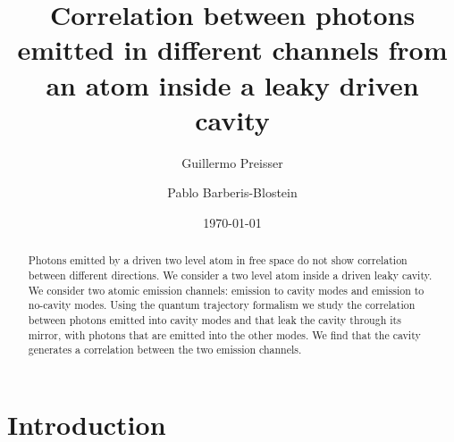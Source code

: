 \documentclass[%
 reprint,
 amsmath,amssymb,
 aps, 
]{revtex4-1}
\begin{document}

\title{Correlation between photons emitted in different channels from
  an atom inside a leaky driven cavity}%

\author{Guillermo Preisser}
\author{Pablo Barberis-Blostein}%



\date{\today}%

\begin{abstract}
  Photons emitted by a driven two level atom in free space do not show
  correlation between different directions. We consider a two level
  atom inside a driven leaky cavity. We consider two atomic emission
  channels: emission to cavity modes and emission to no-cavity modes.
  Using the quantum trajectory formalism we study the correlation
  between photons emitted into cavity modes and that leak the cavity
  through its mirror, with photons that are emitted into the other
  modes. We find that the cavity generates a correlation between the
  two emission channels.
\end{abstract}

\maketitle


\section{Introduction}
\end{document}
